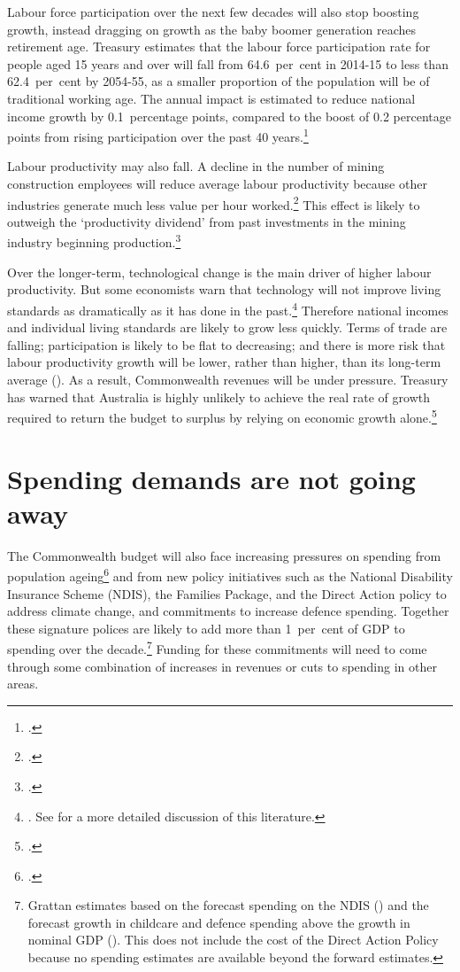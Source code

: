 \documentclass[twoside,english]{palatinob5ona4portrait}
\begin{document}
Labour force participation over the next few decades will also stop boosting growth, instead dragging on growth as the baby boomer generation reaches retirement age. Treasury estimates that the labour force participation rate for people aged 15 years and over will fall from 64.6~per~cent in 2014-15 to less than 62.4~per~cent by 2054-55, as a smaller proportion of the population will be of traditional working age.  The annual impact is estimated to reduce national income growth by 0.1~percentage points, compared to the boost of 0.2 percentage points from rising participation over the past 40 years.\footcite[][pp.~ix,xi]{Hockey2015IGR}  

Labour productivity may also fall. A decline in the number of mining construction employees will reduce average labour productivity because other industries generate much less value per hour worked.\footcite{Borland2014}  This effect is likely to outweigh the ‘productivity dividend’ from past investments in the mining industry beginning production.\footcite[][12]{Commission2014} 

Over the longer-term, technological change is the main driver of higher labour productivity. But some economists warn that technology will not improve living standards as dramatically as it has done in the past.\footnote{\textcites{Gordon2012}{Cowen2011}. See \textcites{DaleyWoodWeidmannEtAl2014}{Dolamore2015} for a more detailed discussion of this literature.}  Therefore national incomes and individual living standards are likely to grow less quickly. Terms of trade are falling; participation is likely to be flat to decreasing; and there is more risk that labour productivity growth will be lower, rather than higher, than its long-term average (). As a result, Commonwealth revenues will be under pressure. Treasury has warned that Australia is highly unlikely to achieve the real rate of growth required to return the budget to surplus by relying on economic growth alone.\footcite{Parkinson2014}  

\section{Spending demands are not going away\label{sec:FISCAL-3-2}}
The Commonwealth budget will also face increasing pressures on spending from population ageing\footcite{Hockey2015IGR}  and from new policy initiatives such as the National Disability Insurance Scheme (NDIS), the Families Package, and the Direct Action policy to address climate change, and commitments to increase defence spending. Together these signature polices are likely to add more than 1~per~cent of GDP to spending over the decade.\footnote{Grattan estimates based on the forecast spending on the NDIS (\textcite{Commission2014})
and the forecast growth in childcare and defence spending above the growth in nominal GDP (\textcite{NationalCommissionAudit2014}). This does not include the cost of the Direct Action Policy because no spending estimates are available beyond the forward estimates. 
}  Funding for these commitments will need to come through some combination of increases in revenues or cuts to spending in other areas. 
\end{document}
